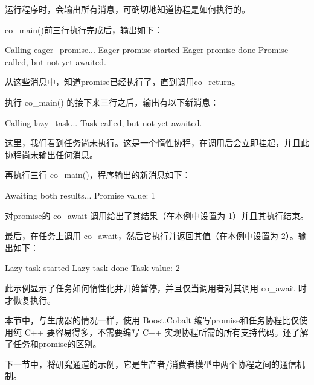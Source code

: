 运行程序时，会输出所有消息，可确切地知道协程是如何执行的。

co\_main()前三行执行完成后，输出如下：

\begin{shell}
Calling eager_promise...
Eager promise started
Eager promise done
Promise called, but not yet awaited.
\end{shell}

从这些消息中，知道promise已经执行了，直到调用co\_return。

执行 co\_main() 的接下来三行之后，输出有以下新消息：

\begin{shell}
Calling lazy_task...
Task called, but not yet awaited.
\end{shell}

这里，我们看到任务尚未执行。这是一个惰性协程，在调用后会立即挂起，并且此协程尚未输出任何消息。

再执行三行 co\_main()，程序输出的新消息如下：

\begin{shell}
Awaiting both results...
Promise value: 1
\end{shell}

对promise的 co\_await 调用给出了其结果（在本例中设置为 1）并且其执行结束。

最后，在任务上调用 co\_await，然后它执行并返回其值（在本例中设置为 2）。输出如下：

\begin{shell}
Lazy task started
Lazy task done
Task value: 2
\end{shell}

此示例显示了任务如何惰性化并开始暂停，并且仅当调用者对其调用 co\_await 时才恢复执行。

本节中，与生成器的情况一样，使用 Boost.Cobalt 编写promise和任务协程比仅使用纯 C++ 要容易得多，不需要编写 C++ 实现协程所需的所有支持代码。还了解了任务和promise的区别。

下一节中，将研究通道的示例，它是生产者/消费者模型中两个协程之间的通信机制。

